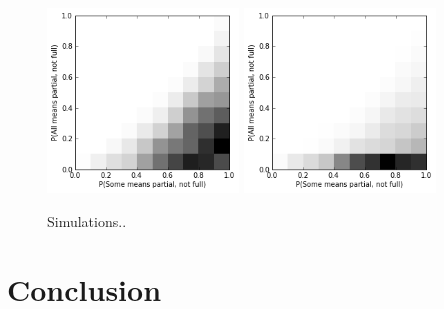 \documentclass{article} %
\begin{document}
\begin{figure}
\centering
\includegraphics[width=2in]{figures/pragmatic_scalar.png}
\includegraphics[width=2in]{figures/nonpragmatic_scalar.png}
\caption{\label{fig:scalar} Simulations..} 
\end{figure}

\section{Conclusion}







\end{document}
